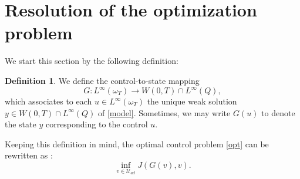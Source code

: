 \documentclass[reqno,twoside]{amsart}
\numberwithin{equation}{section}
\newtheorem{corollary}[theorem]{Corollary}
\theoremstyle{definition}
\newtheorem{definition}[theorem]{Definition}
\numberwithin{equation}{section}
\def \U {{\mathcal U}}
\def \U {\mathcal{U}}
\begin{document}
%

\section{Resolution of the optimization problem \label{control}}
We start this section by the following definition:
\begin{definition}\label{ctso}
We define the control-to-state mapping
$$
G:L^\infty(\omega_T)\to W(0,T)\cap L^\infty(Q),
$$
which associates to each $u\in L^\infty(\omega_T)$ the unique weak solution $y\in W(0,T)\cap L^\infty(Q)$ of \eqref{model}. Sometimes, we may write $G(u)$ to denote the state $y$ corresponding to the control $u$.
\end{definition}
Keeping this definition in mind, the optimal control problem \eqref{opt} can be rewritten as :
\begin{equation}\label{opt2}
\inf_{v\in \U_{ad}} J(G(v),v).
\end{equation}
\end{document}
